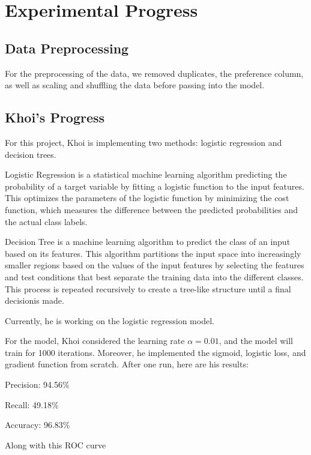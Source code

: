 \section{Experimental Progress}

\subsection{Data Preprocessing}

For the preprocessing of the data, we removed duplicates, the preference column, as well as scaling and shuffling the data before passing into the model.

\subsection{Khoi's Progress}

For this project, Khoi is implementing two methods: logistic regression and decision trees.

Logistic Regression is a statistical machine learning algorithm predicting the probability of a target variable by fitting a logistic function to the input features. This optimizes the parameters of the logistic function by minimizing the cost function, which measures the difference between the predicted probabilities and the actual class labels.

Decision Tree is a machine learning algorithm to predict the class of an input based on its features. This algorithm partitions the input space into increasingly smaller regions based on the values of the input features by selecting the features and test conditions that best separate the training data into the different classes. This process is repeated recursively to create a tree-like structure until a final decisionis made.

Currently, he is working on the logistic regression model.

For the model, Khoi considered the learning rate $\alpha = 0.01$, and the model will train for 1000 iterations. Moreover, he implemented the sigmoid, logistic loss, and gradient function from scratch. After one run, here are his results:

Precision: 94.56\%

Recall: 49.18\%

Accuracy: 96.83\%

Along with this ROC curve


